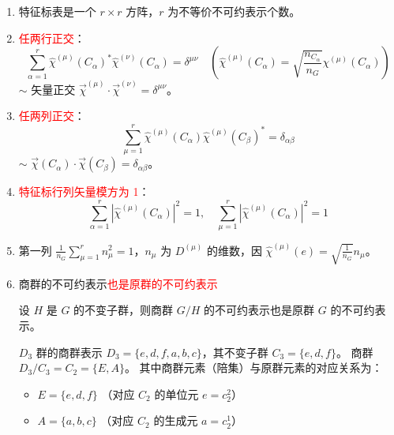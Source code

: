 \begin{enumerate}
    \item 特征标表是一个 $r \times r$ 方阵，$r$ 为不等价不可约表示个数。
    \item \textcolor{red}{任两行正交}：
    \begin{equation}
        \sum_{\alpha=1}^r \hat{\chi}^{(\mu)}(C_\alpha)^* \hat{\chi}^{(\nu)}(C_\alpha) = \delta^{\mu\nu} \quad \left( \hat{\chi}^{(\mu)}(C_\alpha) = \sqrt{\frac{n_{C_\alpha}}{n_G}} \chi^{(\mu)}(C_\alpha) \right)
    \end{equation}
    $\sim$ 矢量正交 $\vec{\chi}^{(\mu)} \cdot \vec{\chi}^{(\nu)} = \delta^{\mu\nu}$。
    
    \item \textcolor{red}{任两列正交}：
    \begin{equation}
        \sum_{\mu=1}^r \hat{\chi}^{(\mu)}(C_\alpha) \hat{\chi}^{(\mu)}(C_\beta)^* = \delta_{\alpha\beta}
    \end{equation}
    $\sim$ $\vec{\chi}(C_\alpha) \cdot \vec{\chi}(C_\beta) = \delta_{\alpha\beta}$。
    
    \item \textcolor{red}{特征标行列矢量模方为 1}：
    \begin{equation}
        \sum_{\alpha=1}^r |\hat{\chi}^{(\mu)}(C_\alpha)|^2 = 1, \quad \sum_{\mu=1}^r |\hat{\chi}^{(\mu)}(C_\alpha)|^2 = 1
    \end{equation}
    
    \item 第一列 $\frac{1}{n_G} \sum_{\mu=1}^r n_\mu^2 = 1$，$n_\mu$ 为 $D^{(\mu)}$ 的维数，因 $\hat{\chi}^{(\mu)}(e) = \sqrt{\frac{1}{n_G}} n_\mu$。




\item 商群的不可约表示\textcolor{red}{也是原群的不可约表示}


  设 $H$ 是 $G$ 的不变子群，则商群 $G/H$ 的不可约表示也是原群 $G$ 的不可约表示。
    
    \begin{example}{$D_3$ 群的商群表示}
        $D_3 = \{e, d, f, a, b, c\}$，其不变子群 $C_3 = \{e, d, f\}$。
        商群 $D_3/C_3 = C_2 = \{E, A\}$。
        其中商群元素（陪集）与原群元素的对应关系为：
        \begin{itemize}
            \item $E = \{e, d, f\}$ （对应 $C_2$ 的单位元 $e=c_2^2$）
            \item $A = \{a, b, c\}$ （对应 $C_2$ 的生成元 $a=c_2^1$）
        \end{itemize}
        

\end{example}
\end{enumerate}
